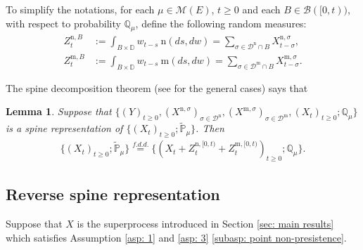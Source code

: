 \documentclass[12pt,a4paper]{amsart}
\theoremstyle{plain}
\newtheorem{lem}[thm]{Lemma}
\theoremstyle{definition}
\numberwithin{equation}{section}
\begin{document}
To simplify the notations, for each $\mu \in \mathcal M(E)$, $t\geq 0$ and each
$B \in \mathscr B([0,t))$, with respect to probability $\mathbb Q_\mu$, define
the following random measures:
\begin{align}
	Z^{\mathrm n,B}_t
	&:= \int_{B\times \mathbb D} w_{t-s} ~\mathrm n (ds,dw)
	= \sum_{\sigma \in \mathcal D^\mathrm n \cap B} X^{\mathrm n,\sigma}_{t-\sigma},
	\\ Z^{\mathrm m,B}_t
	&:= \int_{B\times \mathbb D} w_{t-s} ~\mathrm m (ds,dw)
	= \sum_{\sigma \in \mathcal D^\mathrm m \cap B} X^{\mathrm m,\sigma}_{t-\sigma}.
\end{align}

The spine decomposition theorem (see \cite{RenSongSun2017Spine} for the general
cases) says that
\begin{lem}\label{spine structure}
	Suppose that $\{(Y)_{t\geq 0}, (X^{\mathrm n, \sigma})_{\sigma\in \mathcal
    D^\mathrm n}, (X^{\mathrm m, \sigma})_{\sigma \in \mathcal D^\mathrm m},
  (X_t)_{t\geq 0}; \mathbb Q_{\mu}\}$ is a spine representation of
  $\{(X_t)_{t\geq 0}; \widetilde {\mathbb P}_\mu\}$. Then
\begin{align}
	\{(X_t)_{t\geq 0}; \widetilde{\mathbb P}_\mu\}
	\overset{f.d.d.}{=}
	\{(X_t + Z^{\mathrm n, [0,t)}_{t} + Z^{\mathrm m, [0,t)}_{t} )_{t\geq 0}; \mathbb Q_\mu\}.
\end{align}
\end{lem}
\subsection{Reverse spine representation}
Suppose that $X$ is the superprocess introduced in Section \ref{sec: main
  results} which satisfies Assumption \ref{asp: 1} and \ref{asp: 3}
\eqref{subasp: point non-presistence}.
\end{document}
